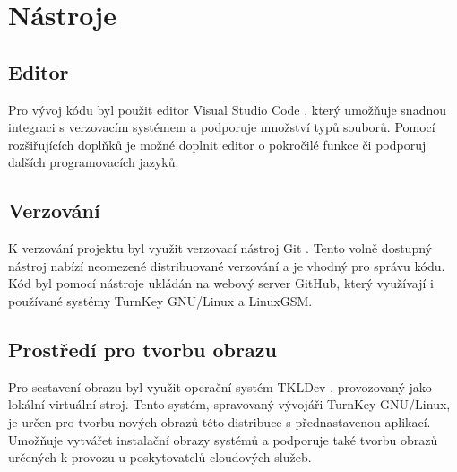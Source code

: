 \section{Nástroje}

\subsection{Editor}

Pro vývoj kódu byl použit editor Visual Studio Code \cite{vscode}, který umožňuje snadnou integraci s verzovacím systémem
a podporuje množství typů souborů. Pomocí rozšiřujících doplňků je možné doplnit editor o pokročilé funkce či podporuj
dalších programovacích jazyků.

\subsection{Verzování}

K verzování projektu byl využit verzovací nástroj Git \cite{git}. Tento volně dostupný nástroj nabízí
neomezené distribuované verzování a je vhodný pro správu kódu.
Kód byl pomocí nástroje ukládán na webový server GitHub, který využívají i používané systémy TurnKey GNU/Linux
a LinuxGSM.

\subsection{Prostředí pro tvorbu obrazu}

Pro sestavení obrazu byl využit operační systém TKLDev \cite{tkldev}, provozovaný jako lokální virtuální stroj. Tento systém, spravovaný vývojáři TurnKey GNU/Linux,
je určen pro tvorbu nových obrazů této distribuce s přednastavenou aplikací. Umožňuje vytvářet instalační obrazy systémů a podporuje
také tvorbu obrazů určených k provozu u poskytovatelů cloudových služeb.